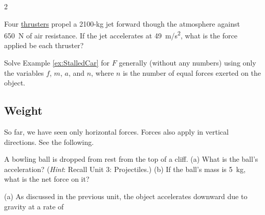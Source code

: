 \documentclass{article}
\numberwithin{equation}{section}
\numberwithin{figure}{section}
\begin{document}
\begin{multicols}{2}
\begin{exercise} \label{DV094w}
Four \href{https://en.wikipedia.org/wiki/Spacecraft_propulsion#/media/File:Shuttle_Main_Engine_Test_Firing.jpg}{thrusters} propel a 2100-kg jet forward though the atmosphere against \SI{650}{N} of air resistance. If the jet accelerates at \SI{49}{m/s^2}, what is the force applied be each thruster? 
\end{exercise}

\begin{exercise} \label{e1ANRE}
Solve Example \ref{ex:StalledCar} for $F$ generally (without any numbers) using only the variables $f$, $m$, $a$, and $n$, where $n$ is the number of equal forces exerted on the object.
\end{exercise}

\end{multicols}

\clearpage

\subsection{Weight} \label{CWxEgd}

So far, we have seen only horizontal forces. Forces also apply in vertical directions. See the following.

\begin{example} \label{ex:weightIntro} 
A bowling ball is dropped from rest from the top of a cliff. (a) What is the ball's acceleration? (\textit{Hint}: Recall Unit 3: Projectiles.) (b) If the ball's mass is \SI{5}{kg}, what is the net force on it?
\end{example}

\Solution

\begin{center}
\end{center}

(a) As discussed in the previous unit, the object accelerates downward due to gravity at a rate of 
\end{document}

